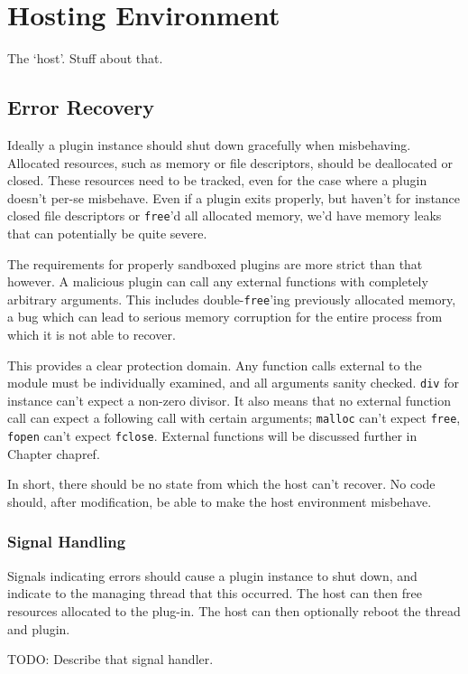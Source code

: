 \chapter {Hosting Environment}

The `host'. Stuff about that.

\section {Error Recovery}

Ideally a plugin instance should shut down gracefully when misbehaving.
Allocated resources, such as memory or file descriptors, should be deallocated
or closed. These resources need to be tracked, even for the case where a plugin
doesn't per-se misbehave. Even if a plugin exits properly, but haven't for
instance closed file descriptors or \texttt{free}'d all allocated memory, we'd
have memory leaks that can potentially be quite severe.

The requirements for properly sandboxed plugins are more strict than that
however. A malicious plugin can call any external functions with completely
arbitrary arguments. This includes double-\texttt{free}'ing previously
allocated memory, a bug which can lead to serious memory corruption for the
entire process from which it is not able to recover.

This provides a clear protection domain. Any function calls external to the
module must be individually examined, and all arguments sanity checked.
\texttt{div} for instance can't expect a non-zero divisor. It also means that
no external function call can expect a following call with certain arguments;
\texttt{malloc} can't expect \texttt{free}, \texttt{fopen} can't expect
\texttt{fclose}. External functions will be discussed further in Chapter
{chapref}. 

In short, there should be no state from which the host can't recover. No code
should, after modification, be able to make the host environment misbehave.

\subsection {Signal Handling}

Signals indicating errors should cause a plugin instance to shut down, and
indicate to the managing thread that this occurred. The host can then free
resources allocated to the plug-in. The host can then optionally reboot the
thread and plugin.

TODO: Describe that signal handler.
